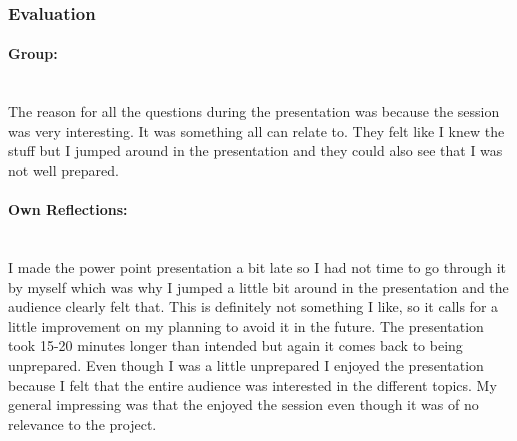 \subsubsection{Evaluation}
\paragraph{Group:}~\\ The reason for all the questions during the presentation was because the session was very interesting. It was something all can relate to. They felt like I knew the stuff but I jumped around in the presentation and they could also see that I was not well prepared.
\paragraph{Own Reflections:}~\\
I made the power point presentation a bit late so I had not time to go through it by myself which was why I jumped a little bit around in the presentation and the audience clearly felt that. This is definitely not something I like, so it calls for a little improvement on my planning to avoid it in the future. The presentation took 15-20 minutes longer than intended but again it comes back to being unprepared. Even though I was a little unprepared I enjoyed the presentation because I felt that the entire audience was interested in the different topics. My general impressing was that the enjoyed the session even though it was of no relevance to the project.